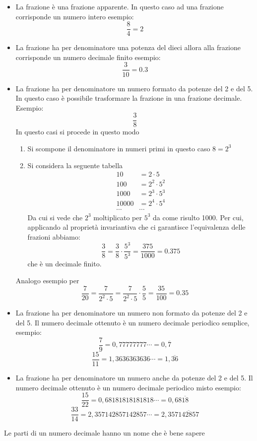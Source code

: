 \begin{itemize}
	\item La frazione è una frazione apparente. In questo caso ad una frazione corrisponde un numero intero esempio: \[\dfrac{8}{4}=\num{2}\]
	\item La frazione ha per denominatore una potenza del dieci allora alla frazione corrisponde un numero decimale finito esempio:\[\dfrac{3}{10}=\num{0.3}\] 
	\item La frazione ha per denominatore un numero formato da potenze del \num{2} e del \num{5}. In questo caso è possibile trasformare la frazione in una frazione decimale. Esempio: \[\dfrac{3}{8}\] In questo casi si procede in questo modo\begin{enumerate}
		\item Si scompone il denominatore in numeri primi in questo caso $8=2^3$
		\item Si considera la seguente tabella 
		\begin{align*}
		\num{10}&=2\cdot 5\\
		\num{100}&=2^2\cdot 5^2\\
		\num{1000}&=2^3\cdot 5^3\\
		\num{10000}&=2^4\cdot 5^4\\
		\cdots&\cdots
		\end{align*}
		Da cui si vede che $2^3$ moltiplicato per $5^3$ da come risulto \num{1000}. Per cui, applicando al proprietà invariantiva che ci garantisce l'equivalenza delle frazioni abbiamo:\[\dfrac{3}{8}=\dfrac{3}{8}\cdot\dfrac{5^3}{5^3}=\dfrac{375}{1000}=\num{0,375}\] che è un decimale finito.
	\end{enumerate}
	Analogo esempio per \[\dfrac{7}{20}=\dfrac{7}{2^2\cdot 5}=\dfrac{7}{2^2\cdot 5}\cdot\dfrac{5}{5}=\dfrac{35}{100}=\num{0,35}\]
	\item La frazione ha per denominatore un numero non formato da potenze del \num{2} e del \num{5}. Il numero decimale ottenuto è un numero decimale periodico semplice, esempio:\[\dfrac{7}{9}=0{,}77777777\cdots=0{,}\overline{7}\]\[\dfrac{15}{11}=1{,}3636363636\cdots=1{,}\overline{36}\]
	\item La frazione ha per denominatore un numero anche da potenze del \num{2} e del \num{5}. Il numero decimale ottenuto è un numero decimale periodico misto esempio:\[\dfrac{15}{22}=0{,}68181818181818\cdots=0{,}68\overline{18}\]\[\dfrac{33}{14}=2{,}357142857142857\cdots=2{,}357\overline{142857}\]
\end{itemize}
Le parti di un numero decimale hanno un nome che è bene sapere %
